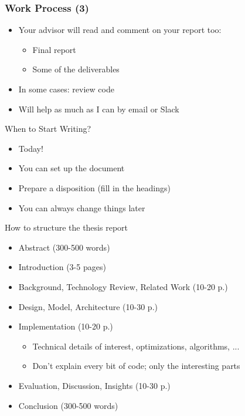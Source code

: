 \documentclass[hyperref={pdfpagelabels=false}, aspectratio=1610]{beamer}
\begin{document}
\begin{frame}
\frametitle{Work Process (3)}
\begin{block}{}
 \begin{itemize}
  \item Your advisor will read and comment on your report too:
  \begin{itemize}
  	\item Final report
  	\item Some of the deliverables
  \end{itemize}
  \item In some cases: review code
  \item Will help as much as I can by email or Slack
 \end{itemize}
\end{block}
\end{frame}


\begin{frame}
\begin{block}{When to Start Writing?}
 \begin{itemize}
  \item<2-> Today!
  \item<3-> You can set up the document 
  \item<4-> Prepare a disposition (fill in the headings)
  \item<5-> You can always change things later
 \end{itemize}
\end{block}
\end{frame}


\begin{frame}
\begin{block}{How to structure the thesis report}
 \begin{itemize}
  \item Abstract (300-500 words)
  \item Introduction (3-5 pages)
  \item Background, Technology Review, Related Work (10-20 p.)
  \item Design, Model, Architecture (10-30 p.)
  \item Implementation (10-20 p.)
  \begin{itemize}
   \item Technical details of interest, optimizations, algorithms, ...
   \item Don't explain every bit of code; only the interesting parts
  \end{itemize}
  \item Evaluation, Discussion, Insights (10-30 p.)
  \item Conclusion (300-500 words)
 \end{itemize}
\end{block}
\end{frame}
\end{document}
